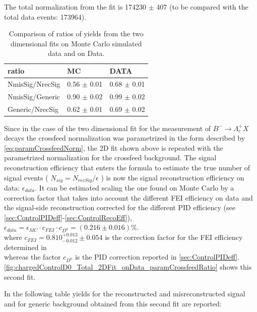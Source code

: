 \noindent  The total normalization from the fit is 174230 $\pm$  407 (to be compared with the total data events: 173964).\\
\vspace{0.5 cm}
 \begin{table}
\begin{tabular}{ |p{3cm}||p{3cm}| p{3cm}|  }

 \hline
 ratio        &          MC      &    DATA   \\
 \hline
 \hline
NmisSig/NrecSig  &  0.56 $\pm$ 0.01  & 0.68 $\pm$ 0.01\\
NmisSig/Generic  &  0.90 $\pm$ 0.02 &  0.99 $\pm$ 0.02  \\
Generic/NrecSig & 0.62 $\pm$ 0.01 & 0.69 $\pm$ 0.02\\
 \hline

\end{tabular}
 \caption{Comparison of ratios of yields from the two dimensional fits on Monte Carlo simulated data and on Data.} 
 \end{table}

 \noindent Since in the case of the two dimensional fit for the measurement of $B^- \rightarrow \Lambda_c^+ X$ decays the crossfeed normalization was parametrized in the form described 
 by \cref{eq:paramCrossfeedNorm}, the 2D fit shown above is repeated with the parametrized normalization for the crossfeed background. The signal reconstruction efficiency  that enters the formula to estimate the true number of 
 signal events ( $ N_{sig}  =  N_{recSig} / \epsilon$ ) is now the signal reconstruction efficiency on data: $\epsilon_{data}$. It can be estimated scaling the one found on Monte Carlo by a correction factor that takes into account the different 
 FEI efficiency on data and the signal-side reconstruction corrected for the different PID efficiency (see \cref{sec:ControlPIDeff}-\cref{sec:ControlRecoEff}), $\epsilon_{data} = \epsilon_{MC} \cdot c_{FEI} \cdot c_{D^0} = (0.216 \pm 0.016)\% $. \\

 where $c_{FEI} = 0.810_{-0.012}^{+0.013} \pm 0.054$ is the correction factor for the FEI efficiency determined in \cite{schwab_judith_2017_21422} \\
 whereas the factor $c_{D^0}$ is the PID correction reported in \cref{sec:ControlPIDeff}.\\
 \noindent \cref{fig:chargedControlD0_Total_2DFit_onData_paramCrossfeedRatio} shows this second fit.
 
 \newpage
 \noindent In the following table yields for the reconstructed and misreconstructed signal and for generic background obtained from this second fit are reported: \\

